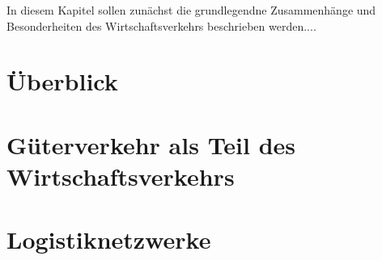 

In diesem Kapitel sollen zunächst die grundlegendne Zusammenhänge und Besonderheiten des Wirtschaftsverkehrs beschrieben werden.... 

\section{Überblick}
\label{gl-wiv-Überblick:sec}


\section{Güterverkehr als Teil des Wirtschaftsverkehrs}
\label{gl-wiv-Güterverkehr:sec}


\section{Logistiknetzwerke}
\label{gl-wiv-Logistik:sec}

